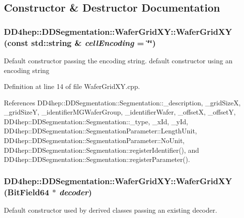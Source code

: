 \subsection{Constructor \& Destructor Documentation}
\hypertarget{class_d_d4hep_1_1_d_d_segmentation_1_1_wafer_grid_x_y_af8bf027d4db4e41a774451c0479e0e58}{
\subsubsection[{WaferGridXY}]{\setlength{\rightskip}{0pt plus 5cm}DD4hep::DDSegmentation::WaferGridXY::WaferGridXY (const std::string \& {\em cellEncoding} = {\ttfamily \char`\"{}\char`\"{}})}}
\label{class_d_d4hep_1_1_d_d_segmentation_1_1_wafer_grid_x_y_af8bf027d4db4e41a774451c0479e0e58}


Default constructor passing the encoding string. default constructor using an encoding string 

Definition at line 14 of file WaferGridXY.cpp.

References DD4hep::DDSegmentation::Segmentation::\_\-description, \_\-gridSizeX, \_\-gridSizeY, \_\-identifierMGWaferGroup, \_\-identifierWafer, \_\-offsetX, \_\-offsetY, DD4hep::DDSegmentation::Segmentation::\_\-type, \_\-xId, \_\-yId, DD4hep::DDSegmentation::SegmentationParameter::LengthUnit, DD4hep::DDSegmentation::SegmentationParameter::NoUnit, DD4hep::DDSegmentation::Segmentation::registerIdentifier(), and DD4hep::DDSegmentation::Segmentation::registerParameter().\hypertarget{class_d_d4hep_1_1_d_d_segmentation_1_1_wafer_grid_x_y_ad592caf7fc7f3b68248e3e81e653c773}{
\subsubsection[{WaferGridXY}]{\setlength{\rightskip}{0pt plus 5cm}DD4hep::DDSegmentation::WaferGridXY::WaferGridXY ({\bf BitField64} $\ast$ {\em decoder})}}
\label{class_d_d4hep_1_1_d_d_segmentation_1_1_wafer_grid_x_y_ad592caf7fc7f3b68248e3e81e653c773}


Default constructor used by derived classes passing an existing decoder. 

